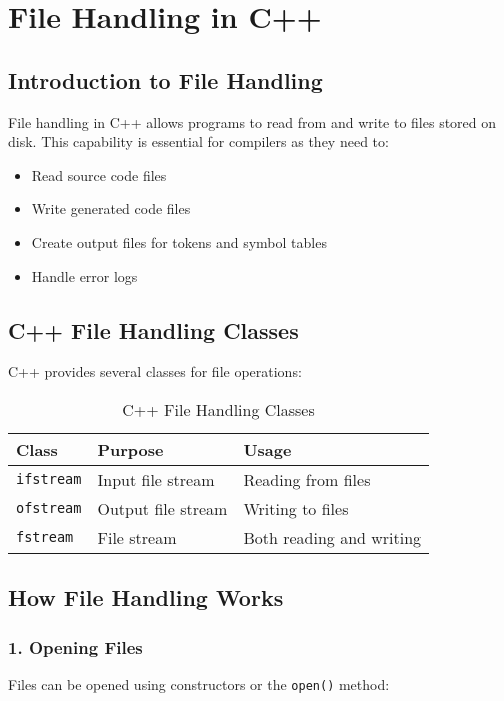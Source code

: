 \documentclass[12pt,a4paper]{article}
\begin{document}
\section{File Handling in C++}

\subsection{Introduction to File Handling}

File handling in C++ allows programs to read from and write to files stored on disk. This capability is essential for compilers as they need to:
\begin{itemize}
    \item Read source code files
    \item Write generated code files
    \item Create output files for tokens and symbol tables
    \item Handle error logs
\end{itemize}

\subsection{C++ File Handling Classes}

C++ provides several classes for file operations:

\begin{table}[H]
\centering
\begin{tabular}{|l|l|l|}
\hline
\textbf{Class} & \textbf{Purpose} & \textbf{Usage} \\
\hline
\texttt{ifstream} & Input file stream & Reading from files \\
\texttt{ofstream} & Output file stream & Writing to files \\
\texttt{fstream} & File stream & Both reading and writing \\
\hline
\end{tabular}
\caption{C++ File Handling Classes}
\end{table}

\subsection{How File Handling Works}

\subsubsection{1. Opening Files}
Files can be opened using constructors or the \texttt{open()} method:
\end{document}
